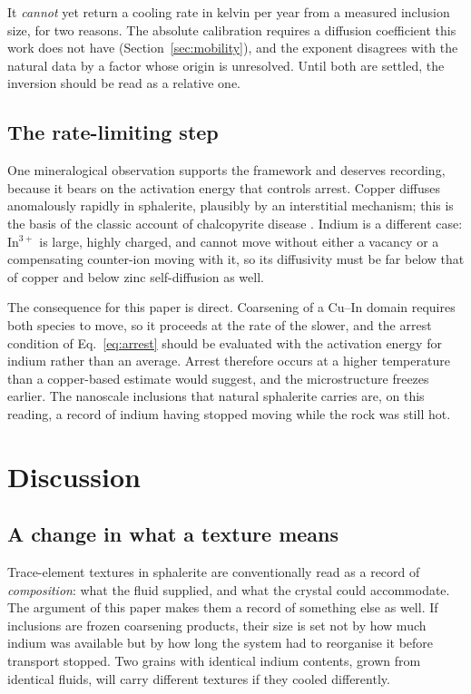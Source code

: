 \documentclass[preprint,12pt,authoryear]{elsarticle}
\begin{document}
It \emph{cannot} yet return a cooling rate in kelvin per year from a measured
inclusion size, for two reasons. The absolute calibration requires a diffusion
coefficient this work does not have (Section~\ref{sec:mobility}), and the
exponent disagrees with the natural data by a factor whose origin is unresolved.
Until both are settled, the inversion should be read as a relative one.

\subsection{The rate-limiting step}

One mineralogical observation supports the framework and deserves recording,
because it bears on the activation energy that controls arrest. Copper diffuses
anomalously rapidly in sphalerite, plausibly by an interstitial mechanism; this
is the basis of the classic account of chalcopyrite disease
\citep{barton1987}. Indium is a different case: In$^{3+}$ is large, highly
charged, and cannot move without either a vacancy or a compensating counter-ion
moving with it, so its diffusivity must be far below that of copper and below
zinc self-diffusion as well.

The consequence for this paper is direct. Coarsening of a Cu--In domain requires
both species to move, so it proceeds at the rate of the slower, and the arrest
condition of Eq.~\eqref{eq:arrest} should be evaluated with the activation
energy for indium rather than an average. Arrest therefore occurs at a higher
temperature than a copper-based estimate would suggest, and the microstructure
freezes earlier. The nanoscale inclusions that natural sphalerite carries are,
on this reading, a record of indium having stopped moving while the rock was
still hot.

\section{Discussion}
\label{sec:discussion}

\subsection{A change in what a texture means}

Trace-element textures in sphalerite are conventionally read as a record of
\emph{composition}: what the fluid supplied, and what the crystal could
accommodate. The argument of this paper makes them a record of something else
as well. If inclusions are frozen coarsening products, their size is set not by
how much indium was available but by how long the system had to reorganise it
before transport stopped. Two grains with identical indium contents, grown from
identical fluids, will carry different textures if they cooled differently.
\end{document}
